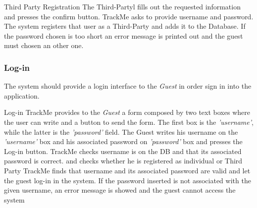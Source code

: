 \documentclass[a4paper]{article}
\begin{document}
        \begin{usecase}{Third Party Registration}
              {The Third-Partyl fills out the requested information and presses the confirm button.}
               {TrackMe asks to provide username and password.}
              {The system registers that user as a Third-Party and adds it to the  Database.}
        {If the password chosen is too short an error message is printed out and the guest must chosen an other one.}
      \end{usecase}
        
        \subsubsection{Log-in}
        The system should provide a login interface to the \textit{Guest} in order sign in into the application.
        
        \begin{usecase}{Log-in}
              {TrackMe provides to the \textit{Guest} a form composed by two text boxes where the user can write and a button to send the form. The first box is the \textit{'username'}, while the latter is the \textit{'password'} field.}
              {The Guest writes his username on the \textit{'username'} box and his associated password on \textit{'password'} box and presses the Log-in button.}
              {TrackMe checks username is on the DB and that its associated password is correct. and checks whether he is  registered as individual or Third Party}
              {TrackMe finds that username and its associated password are valid and let the guest log-in in the system.}
        {If the password inserted is not associated with the given username, an error message is showed and the guest cannot access the system}
        \end{usecase}
        
\end{document}
